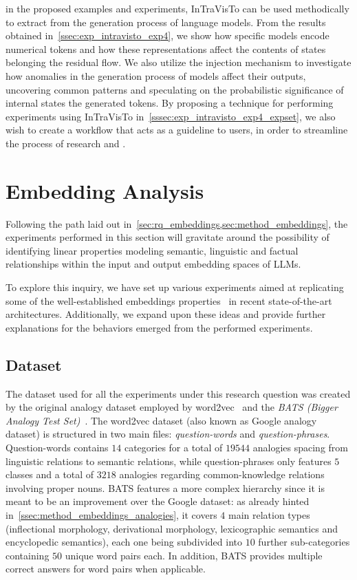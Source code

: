  in the proposed examples and experiments, InTraVisTo can be used methodically to extract  from the generation process of language models.
From the results obtained in~\cref{ssec:exp_intravisto_exp4}, we show how specific models encode numerical tokens and how these representations affect the contents of states belonging the residual flow.
We also utilize the injection mechanism to investigate how anomalies in the generation process of models affect their outputs, uncovering common patterns and speculating on the probabilistic significance of internal states  the generated tokens.
By proposing a technique for performing experiments using InTraVisTo in~\cref{sssec:exp_intravisto_exp4_expset}, we also wish to create a workflow that acts as a guideline to users, in order to streamline the process of research and .

\section{Embedding Analysis}\label{sec:exp_emb}

Following the path laid out in~\cref{sec:rq_embeddings,sec:method_embeddings}, the experiments performed in this section will gravitate around the possibility of identifying linear properties modeling semantic, linguistic and factual relationships within the input and output embedding spaces of LLMs.

To explore this inquiry, we have set up various experiments aimed at replicating some of the well-established embeddings properties~\cite{mikolov2013} in recent state-of-the-art architectures.
Additionally, we expand upon these ideas and provide further explanations for the behaviors emerged from the performed experiments.

\subsection{Dataset}

The dataset used for all the experiments under this research question was created by  the original analogy dataset employed by word2vec~\cite{mikolov2013} and the \emph{BATS (Bigger Analogy Test Set)}~\cite{drozd2016}.
The word2vec dataset (also known as Google analogy dataset) is structured in two main files: \emph{question-words} and \emph{question-phrases}.
Question-words contains $14$ categories for a total of $19544$ analogies spacing from linguistic relations to semantic relations, while question-phrases only features $5$ classes and a total of $3218$ analogies regarding common-knowledge relations involving proper nouns.
BATS features a more complex hierarchy since it is meant to be an improvement over the Google dataset: as already hinted in~\cref{ssec:method_embeddings_analogies}, it covers $4$ main relation types (inflectional morphology, derivational morphology, lexicographic semantics and encyclopedic semantics), each one being subdivided into $10$ further sub-categories containing $50$ unique word pairs each.
In addition, BATS provides multiple correct answers for word pairs when applicable.

